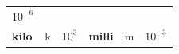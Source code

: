 {{\begin{center}
\begin{tabular}[t]{|l|l|l|l|l|l|}
        
                \begin{math}{10}^{-6}\end{math}
     \tabularnewline\cline{1-1}\cline{2-2}\cline{3-3}\cline{4-4}\cline{5-5}\cline{6-6}
    
    
        
                \textbf{kilo}
               &
    
    
        k &
    
    
        
                \begin{math}{10}^{3}\end{math}
               &
    
    
        
                \textbf{milli}
               &
    
    
        m &
    
    
        
                \begin{math}{10}^{-3}\end{math}
     \tabularnewline\cline{1-1}\cline{2-2}\cline{3-3}\cline{4-4}\cline{5-5}\cline{6-6}
    

\end{tabular}
\end{center}}}
